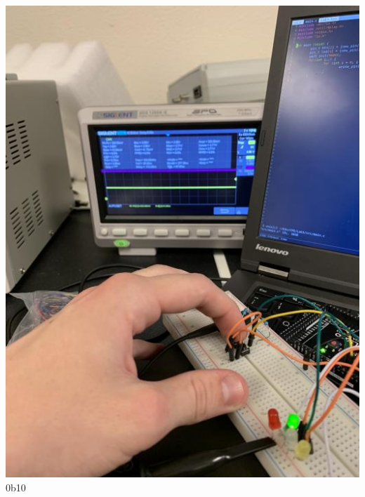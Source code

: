 \documentclass[]{article}
\begin{document}
\begin{center}
	\includegraphics[scale=.585]{1.jpg}\\
	\pagebreak
	0b10\\

\end{center}
\end{document}
